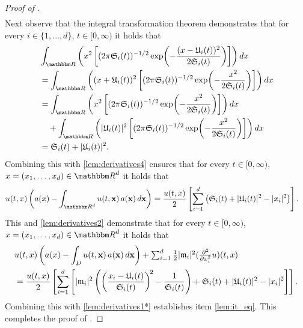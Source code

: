 \begin{proof}[Proof of ]
\begin{equation}
\begin{split}
		\end{split}
	\end{equation}
	Next observe that the integral transformation theorem demonstrates that for every
	$i \in \{1, \dots,d\}$,
	$t \in [0,\infty)$
	it holds that
	\begin{equation}
		\begin{aligned}
			&\int_\R \left(  x^2 \left[ (2\pi    \mathfrak{S}_i(t))^{-1/2}    \exp \! \left( - \frac{( x -\mathfrak{U}_i(t) )^2}{2\mathfrak{S}_i(t)}\right) \right] \right) d x \\
			&= \int_\R \left(  (x + \mathfrak{U}_i(t))^2 \left[ (2\pi    \mathfrak{S}_i(t))^{-1/2}    \exp \! \left( - \frac{x^2}{2\mathfrak{S}_i(t)}\right) \right] \right) d x\\
			&= \int_\R \left(  x ^2 \left[ (2\pi    \mathfrak{S}_i(t))^{-1/2}    \exp \! \left( - \frac{x^2}{2\mathfrak{S}_i(t)}\right) \right] \right) d x \\
			&\quad + \int_\R \left(  |\mathfrak{U}_i(t)|^2 \left[ (2\pi    \mathfrak{S}_i(t))^{-1/2}    \exp \! \left( - \frac{x^2}{2\mathfrak{S}_i(t)}\right) \right] \right) d x\\
			&=\mathfrak{S}_i(t) + |\mathfrak{U}_i(t)|^2.
		\end{aligned}
	\end{equation}
	Combining this with \eqref{lem:derivatives4} ensures that for every
	$t \in [0,\infty)$,
	$x = (x_1, \dots,x_d)\in \R^d$
	it holds that 
	\begin{equation}\label{lem:derivatives3}
		\begin{split}
			&u(t,x)\left( a(x) - \int_{\R^d} u(t,{\textbf x})\, a({\textbf x}) \, d{\textbf x} \right) = \frac{u(t,x)}{2} \left[ \sum_{i=1}^d \left( \mathfrak{S}_i(t) + |\mathfrak{U}_i(t)|^2 - |x_i|^2 \right) \right].
		\end{split}
	\end{equation}
	This and \eqref{lem:derivatives2} demonstrate that for every
	$t \in [0,\infty)$,
	$x = (x_1, \dots,x_d)\in \R^d$
	it holds that
	\begin{equation}
		\begin{aligned}
			& u(t,x)\left(a(x) - \int_{D} u(t,{\textbf x})\, a({\textbf x}) \, d{\textbf x} \right) + \textstyle\sum_{i=1}^{d} \frac{1}{2} |\mathfrak{m}_i|^2 (\tfrac{\partial^2 }{\partial x_i^2} u) (t,x) \\
			&= \frac{u(t,x)}{2} \left[ \sum_{i=1}^d \left[  |\mathfrak{m}_i|^2  \left( \bigg(\frac{x_i - \mathfrak{U}_i(t)}{\mathfrak{S}_i(t)}\bigg)^{\!2} - \frac{1}{\mathfrak{S}_i(t)} \right) + \mathfrak{S}_i(t) + |\mathfrak{U}_i(t)|^2 - |x_i|^2 \right]\right].
		\end{aligned}
	\end{equation}
	Combining this with \eqref{lem:derivatives1*} establishes item \eqref{lem:it_eq}. This completes the proof of .
\end{proof}

